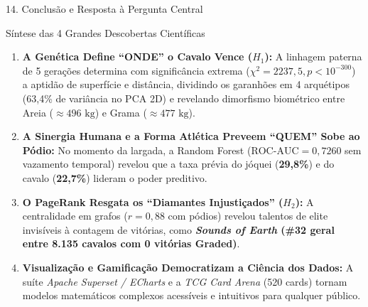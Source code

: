 \documentclass[aspectratio=169,10pt]{beamer}
\begin{document}
\begin{frame}{14. Conclusão e Resposta à Pergunta Central}
\begin{exampleblock}{Síntese das 4 Grandes Descobertas Científicas}
\begin{enumerate}
    \item \textbf{A Genética Define ``ONDE'' o Cavalo Vence ($H_1$):} A linhagem paterna de 5 gerações determina com significância extrema ($\chi^2 = 2237,5, p < 10^{-300}$) a aptidão de superfície e distância, dividindo os garanhões em 4 arquétipos (63,4\% de variância no PCA 2D) e revelando dimorfismo biométrico entre Areia ($\approx 496\text{ kg}$) e Grama ($\approx 477\text{ kg}$).
    \item \textbf{A Sinergia Humana e a Forma Atlética Preveem ``QUEM'' Sobe ao Pódio:} No momento da largada, a Random Forest ($\text{ROC-AUC} = 0,7260$ sem vazamento temporal) revelou que a taxa prévia do jóquei (\textbf{29,8\%}) e do cavalo (\textbf{22,7\%}) lideram o poder preditivo.
    \item \textbf{O PageRank Resgata os ``Diamantes Injustiçados'' ($H_2$):} A centralidade em grafos ($r = 0,88$ com pódios) revelou talentos de elite invisíveis à contagem de vitórias, como \textbf{\textit{Sounds of Earth} (\#32 geral entre 8.135 cavalos com 0 vitórias Graded)}.
    \item \textbf{Visualização e Gamificação Democratizam a Ciência dos Dados:} A suíte \textit{Apache Superset / ECharts} e a \textit{TCG Card Arena} (520 cards) tornam modelos matemáticos complexos acessíveis e intuitivos para qualquer público.
\end{enumerate}
\end{exampleblock}
\end{frame}
\end{document}
